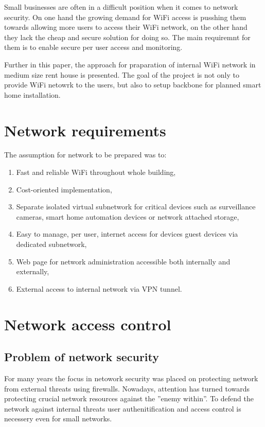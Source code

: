 \documentclass{llncs}
\begin{document}
Small businesses are often in a difficult position when it comes to network
security. On one hand the growing demand for WiFi access is pusshing them
towards allowing more users to access their WiFi network, on the other hand they
lack the cheap and secure solution for doing so. The main requiremnt for them is
to enable secure per user access and monitoring. 

Further in this paper, the approach for praparation of internal WiFi network in
medium size rent house is presented. The goal of the project is not only to
provide WiFi netowrk to the users, but also to setup backbone for planned
smart home installation.

\section{Network requirements}

The assumption for network to be prepared was to:
\begin{enumerate}
  \item Fast and reliable WiFi throughout whole building,
  \item Cost-oriented implementation,
  \item Separate isolated virtual subnetwork for critical devices
such as surveillance cameras, smart home automation devices or network attached
storage,
  \item Easy to manage, per user, internet access for devices guest devices via
  dedicated subnetwork,
  \item Web page for network administration accessible both internally and
  externally,
  \item External access to internal network via VPN tunnel.
\end{enumerate}


\section{Network access control}

\subsection{Problem of network security}
For many years the focus in netowork security was placed on protecting
network from external threats using firewalls. Nowadays, attention has turned
towards protecting crucial network resources against the ''enemy within''. To
defend the network against internal threats user authenitification and
access control is necessery even for small networks. 
\end{document}
